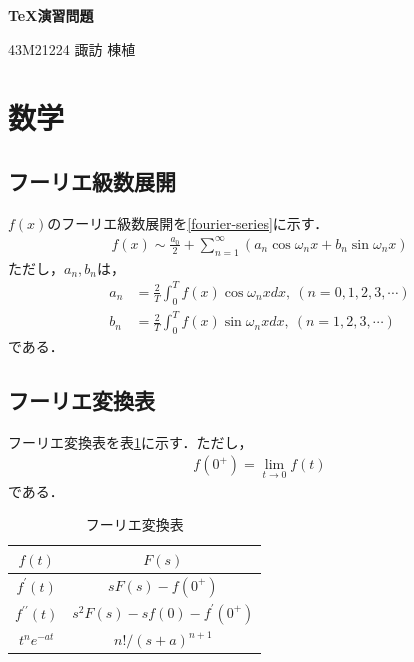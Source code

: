 \documentclass[11pt,a4paper]{jsarticle}
\begin{document}
\begin{center}
  {\Large\bfseries \TeX 演習問題} %
\end{center}
\begin{flushright}
  {\large 43M21224 諏訪 棟植} %
\end{flushright}

%
%

\section{数学}

\subsection{フーリエ級数展開}


$f(x)$のフーリエ級数展開を\eqref{fourier-series}に示す．
\begin{align}\label{fourier-series}
  f(x)\sim\frac{a_0}{2}+\sum_{n=1}^\infty\left(a_n\cos \omega_nx+b_n\sin \omega_nx\right)
\end{align}
ただし，$a_n,b_n$は，
\begin{align*}
  a_n & =\frac{2}{T}\int_0^T f(x)\cos\omega_nx dx,~(n=0,1,2,3,\cdots) \\
  b_n & =\frac{2}{T}\int_0^T f(x)\sin\omega_nx dx,~(n=1,2,3,\cdots)
\end{align*}
である．

\subsection{フーリエ変換表}

フーリエ変換表を表\ref{tab:fourier-transform}に示す．ただし，
\begin{align*}
  f(0^+)=\lim_{t\to 0}f(t)
\end{align*}
である．

\begin{table}[hbt]
  \centering
  \caption{フーリエ変換表}
  \label{tab:fourier-transform}
  \begin{tabular}{c|c}
    $f(t)$                & $F(s)$                        \\ \hline
    $f^\prime(t)$         & $sF(s)-f(0^+)$                \\
    $f^{\prime\prime}(t)$ & $s^2F(s)-sf(0)-f^\prime(0^+)$ \\
    $t^ne^{-at}$          & $n!/(s+a)^{n+1}$              \\
  \end{tabular}
\end{table}
\end{document}
